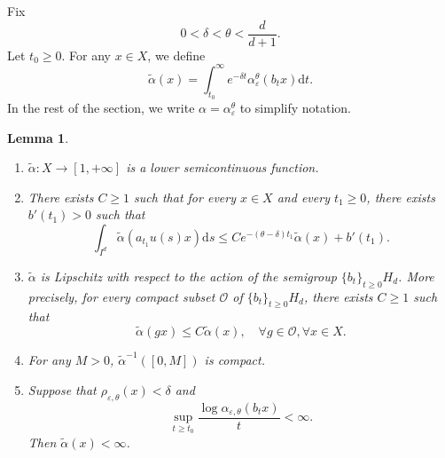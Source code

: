 \documentclass[12pt,reqno]{amsart}
\numberwithin{equation}{section}
\theoremstyle{plain}
\newtheorem{lem}[thm]{Lemma}
\theoremstyle{definition}
\theoremstyle{remark}
\newcommand{\eps}{\varepsilon}
\newcommand{\de}{\mathrm{d}}
\newcommand{\at}{\widetilde{\alpha}}
\begin{document}
  Fix
    \begin{equation} \label{eq:theta}
    0<\delta<\theta<\frac{d}{d+1}. 
    \end{equation}
    Let $t_0\geq 0$. For any $x\in X$, we define
	\begin{equation} \label{eq:definition_alpha_tilde}
	\at (x)=\int_{t_0}^{\infty}e^{-\delta t}\alpha_\eps^\theta(b_{t}x)\de t.
	\end{equation}
In the rest of the section, we write $\alpha=\alpha_\eps^\theta$ to simplify notation.
	
	\begin{lem} \label{lem:properties_of_alpha'}
		\begin{enumerate}
			\item \label{itm:property1_of_alpha'} $\at \colon X\to[1,+\infty]$ is a lower semicontinuous function. 
           
			\item \label{itm:contraction-alpha}
            There exists $C\geq1$ such that for every $x\in X$ and every $t_1\geq 0$, there exists $b'(t_1)>0$ such that
			\begin{equation} \label{eq:contraction_alpha'}
			\int_{I^d}\at (a_{t_1}u(s)x)\de s\leq Ce^{-(\theta-\delta)t_1}\at (x)+b'(t_1).
			\end{equation}
			\item \label{itm:alpha-Lipschitz}
            $\at $ is Lipschitz with respect to the action of the semigroup $\{b_t\}_{t\geq0}H_d$. More precisely, for every compact subset $\mathcal{O}$ of $\{b_t\}_{t\geq0}H_d$, there exists $C\geq1$ such that
			\begin{equation*}
			\at (gx)\leq C\at (x),\quad\forall g\in\mathcal{O},\forall x\in X.
			\end{equation*}
			\item \label{itm:alpha-proper} 
            For any $M>0$, $\at ^{-1}([0,M])$ is compact.
             \item \label{itm:alpha-finite} 
             Suppose that  $\rho_{\eps,\theta}(x)<\delta$ and 
             \begin{equation}
             \label{eq:t0}
             \sup_{t\geq t_0} \frac{\log\alpha_{\eps,\theta}(b_tx)}{t}<\infty.
             \end{equation} Then $\tilde\alpha(x)<\infty$.
		\end{enumerate}
	\end{lem}
\end{document}
